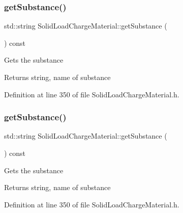 \subsubsection{\texorpdfstring{get\+Substance()}{getSubstance()}\hspace{0.1cm}{\footnotesize\ttfamily [1/3]}}
{\footnotesize\ttfamily std\+::string Solid\+Load\+Charge\+Material\+::get\+Substance (\begin{DoxyParamCaption}{ }\end{DoxyParamCaption}) const\hspace{0.3cm}{\ttfamily [inline]}}

Gets the substance \begin{DoxyReturn}{Returns}
string, name of substance 
\end{DoxyReturn}


Definition at line 350 of file Solid\+Load\+Charge\+Material.\+h.

\mbox{\label{class_solid_load_charge_material_ade525be6bb8cb86405daeb61d45311f9}} 
\subsubsection{\texorpdfstring{get\+Substance()}{getSubstance()}\hspace{0.1cm}{\footnotesize\ttfamily [2/3]}}
{\footnotesize\ttfamily std\+::string Solid\+Load\+Charge\+Material\+::get\+Substance (\begin{DoxyParamCaption}{ }\end{DoxyParamCaption}) const\hspace{0.3cm}{\ttfamily [inline]}}

Gets the substance \begin{DoxyReturn}{Returns}
string, name of substance 
\end{DoxyReturn}


Definition at line 350 of file Solid\+Load\+Charge\+Material.\+h.

\mbox{\label{class_solid_load_charge_material_ade525be6bb8cb86405daeb61d45311f9}} 
